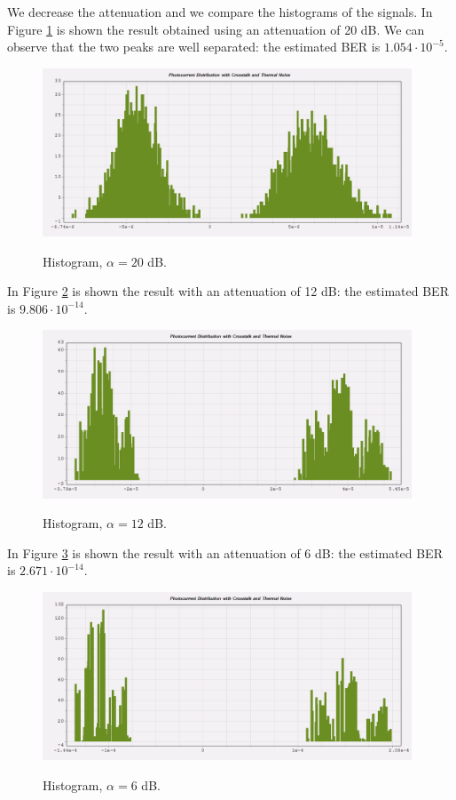 \documentclass[a4paper,10pt]{report}
\begin{document}
We decrease the attenuation and we compare the histograms of the signals.
In Figure \ref{ex1_2} is shown the result obtained using an attenuation of 20 dB.
We can observe that the two peaks are well separated: the estimated BER is $1.054 \cdot 10^{-5}$.

\begin{figure}[!ht]
   \centering
   \includegraphics[width=11cm]{ex1_2.png}\\
   \caption{Histogram, $\alpha = 20$ dB.}
   \label{ex1_2}
\end{figure}


In Figure \ref{ex1_3} is shown the result with an attenuation of 12 dB: the estimated BER is $9.806 \cdot 10^{-14}$.

\begin{figure}[!ht]
   \centering
   \includegraphics[width=11cm]{ex1_3.png}\\
   \caption{Histogram, $\alpha = 12$ dB.}
   \label{ex1_3}
\end{figure}

In Figure \ref{ex1_4} is shown the result with an attenuation of 6 dB: the estimated BER is $2.671 \cdot 10^{-14}$.

\begin{figure}[!ht]
   \centering
   \includegraphics[width=11cm]{ex1_4.png}\\
   \caption{Histogram, $\alpha = 6$ dB.}
   \label{ex1_4}
\end{figure}
\end{document}
